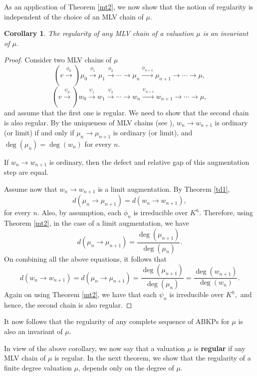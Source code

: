 \documentclass[11pt]{amsart}
\newtheorem{corollary}[theorem]{Corollary}
\theoremstyle{definition}
\theoremstyle{remark}
\numberwithin{equation}{section}
\begin{document}
		As an application of Theorem \ref{mt2}, we now show that the notion of regularity is independent of the choice of an MLV chain of $\mu.$
		\begin{corollary}\label{lc}
		The regularity of any MLV chain of a valuation $\mu$ is an invariant of $\mu.$
		\end{corollary}
		\begin{proof}
			Consider two MLV chains of $\mu$  \[(v\xrightarrow{\phi_0})\mu_0\xrightarrow{\phi_1} \mu_1\xrightarrow{\phi_2}\cdots \longrightarrow \mu_{n}\xrightarrow{\phi_{n+1}} \mu_{n+1}\longrightarrow\cdots\longrightarrow \mu,\] 
		\[(v\xrightarrow{\psi_0})w_0\xrightarrow{\psi_1} w_1\xrightarrow{\psi_2}\cdots \longrightarrow w_{n}\xrightarrow{\psi_{n+1}} w_{n+1}\longrightarrow\cdots\longrightarrow \mu,\] and assume that the first one is regular. We need to show that the second chain is also regular. By the uniqueness of MLV chains (see \cite[Theorem 4.7]{EN1}), $w_n\longrightarrow w_{n+1}$ is ordinary (or limit) if and only if $\mu_n\longrightarrow \mu_{n+1}$ is ordinary (or limit), and $\deg(\mu_n)=\deg(w_n)$ for every $n.$ 
		
		If $w_n\longrightarrow w_{n+1}$ is ordinary, then the defect and relative gap of this augmentation step are equal.
		
		 Assume now that $w_n\longrightarrow w_{n+1}$ is a limit augmentation. By Theorem \ref{td1},  \[d(\mu_n\longrightarrow \mu_{n+1})=d(w_n\longrightarrow w_{n+1}),\]  for every $n.$ Also, by assumption, each $\phi_n$ is irreducible over $K^h.$ Therefore, using Theorem \ref{mt2}, in the case of a limit augmentation, we have \[d(\mu_n\longrightarrow \mu_{n+1})=\frac{\deg(\mu_{n+1})}{\deg(\mu_n)}.\] On combining all the above equations, it follows that 
		\[d(w_n\longrightarrow w_{n+1})=d(\mu_n\longrightarrow \mu_{n+1})=\frac{\deg(\mu_{n+1})}{\deg(\mu_n)}=\frac{\deg(w_{n+1})}{\deg(w_n)}.\] Again on using Theorem \ref{mt2}, we have that each $\psi_n$ is irreducible over $K^h,$ and hence, the second chain is also regular.
		\end{proof}
		
		
		It now follows that the regularity of any complete sequence of ABKPs for $\mu$ is also an invariant of $\mu.$
		
		In view of the above corollary, we now say that a valuation $\mu$ is {\bf regular} if any MLV chain of $\mu$ is regular. In the next theorem, we show that the regularity of a finite degree valuation $\mu$, depends only on the degree of $\mu.$
		 
\end{document}
